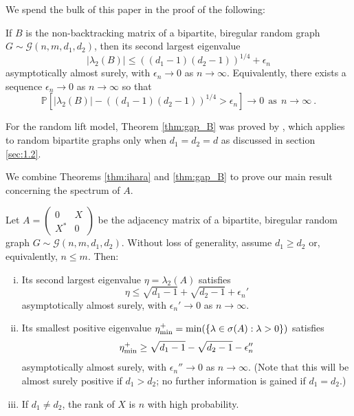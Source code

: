 We spend the bulk of this paper in the proof of the following:
\begin{theorem}
\label{thm:gap_B} 
If $B$ is the non-backtracking matrix of a bipartite, biregular random graph
$G \sim \mathcal{G}(n,m,d_1,d_2)$,
then its second largest eigenvalue
\[
|\lambda_2 (B)| \leq ((d_1-1)(d_2-1))^{1/4}+\epsilon_n
\]
asymptotically almost surely, with $\epsilon_n \to 0$ as $n \to \infty$. Equivalently, there exists a sequence $\epsilon_n \rightarrow 0$ as $n \rightarrow \infty$ so that 
\[
\mathbb{P}\left [ |\lambda_2(B)| - ((d_1-1)(d_2-1))^{1/4} >\epsilon_n \right ] \rightarrow 0 ~~\mbox{as}~~ n \rightarrow \infty~.
\]
\end{theorem}
%
\begin{remark}
For the random lift model, Theorem \ref{thm:gap_B} was proved by \citet*{bordenave2015}, which applies to random bipartite graphs only when $d_1=d_2=d$ as discussed in section \ref{sec:1.2}. 
\end{remark}
We combine Theorems \ref{thm:ihara} and \ref{thm:gap_B} to prove our main result concerning the spectrum of $A$.   
\begin{theorem}
\label{cor:gap_A}
Let
$
A=\left(\begin{array}{cc} 0 & X \\
X^* & 0 \end{array}\right )
$
be the adjacency matrix of a bipartite, biregular random graph
$G \sim \mathcal{G}(n,m,d_1,d_2)$. 
Without loss of generality, assume $d_1 \geq d_2$ or, equivalently, $n \leq m$.
Then:
\begin{enumerate}[(i)]
\item Its second largest eigenvalue $\eta = \lambda_2 (A)$ satisfies
\[
\eta \leq \sqrt{d_1-1}+\sqrt{d_2-1}+ \epsilon_n'
\]
asymptotically almost surely, with $\epsilon_n' \to 0$ as $n \to \infty$.
\item  Its smallest positive eigenvalue $\eta^+_{\rm min} = \min ( \{\lambda \in \sigma(A): \lambda > 0\} )$ satisfies
\[
\eta_{\rm min}^+\geq \sqrt{d_1-1}-\sqrt{d_2-1}- \epsilon_n''
\]
asymptotically almost surely, with $\epsilon_n''\to 0$ as $n \to \infty$. (Note that this will be almost surely positive if $d_1>d_2$; no further information is gained if $d_1 = d_2$.)
\item If $d_1 \neq d_2$, the rank of $X$ is $n$ with high probability.
\end{enumerate}
\end{theorem}

